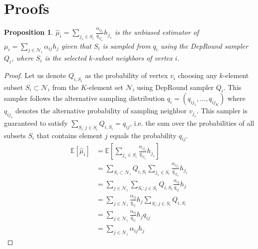 \documentclass{article}
\newtheorem{proposition}{Proposition}
\begin{document}
\section{Proofs}\label{appendix:proof}
\setcounter{theorem}{0}
\setcounter{property}{0}
\setcounter{proposition}{0}

\begin{proposition}\label{proposition:estimator2}
$\hat{\mu}_i = \sum_{j_s\in S_i}\frac{\alpha_{ij_s}}{q_{ij_s}}h_{j_s}$ 
is the unbiased estimator of $\mu_i=\sum_{j\in\mathcal{N}_i}\alpha_{ij}h_j$ 
given that $S_i$ is sampled from $q_i$ using the DepRound 
sampler $Q_{i}$, where $S_i$ is 
the selected $k$-subset neighbors of vertex $i$.
\end{proposition}
\begin{proof}
Let us denote $Q_{i,S_i}$ as the probability of vertex 
$v_i$ choosing any $k$-element subset $S_i \subset \mathcal{N}_i$ 
from the $K$-element set $\mathcal{N}_i$ using DepRound sampler $Q_i$.
This sampler follows the alternative sampling distribution
$q_i = (q_{ij_{1}}, ..., q_{ij_{K}})$ where $q_{ij_{s}}$ denotes
the alternative probability of sampling neighbor $v_{j_s}$.
This sampler is guaranteed to satisfy $\sum_{S_i : j\in S_i}Q_{i,S_i} = q_{ij}$, i.e. the sum over the probabilities of all subsets $S_i$ that
contains element $j$ equals the probability $q_{ij}$.
\begin{align}
	\mathbb{E}\left[ \hat{\mu}_i \right]
	&= \mathbb{E}\left[\sum_{j_s\in S_i}\frac{\alpha_{ij_s}}{q_{ij_s}}h_{j_s}\right] \\ 
	&= \sum_{S_i\subset\mathcal{N}_i}Q_{i,S_i}\sum_{j_s\in S_i}\frac{\alpha_{ij_s}}{q_{ij_s}}h_{j_s} \\
	&= \sum_{j\in\mathcal{N}_i}\sum_{S_i:j\in S_i}Q_{i,S_i}\frac{\alpha_{ij}}{q_{ij}}h_j \\
	&= \sum_{j\in\mathcal{N}_i}\frac{\alpha_{ij}}{q_{ij}}h_j\sum_{S_i:j\in S_i}Q_{i,S_i} \\
	&= \sum_{j\in\mathcal{N}_i}\frac{\alpha_{ij}}{q_{ij}}h_j q_{ij} \label{eq1} \\
	&= \sum_{j\in\mathcal{N}_i}\alpha_{ij}h_j
\end{align}
\end{proof}
\end{document}
